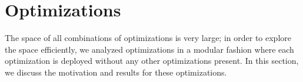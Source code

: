 \section{Optimizations}\label{sec:opt}
The space of all combinations of optimizations is very large; in order to
explore the space efficiently, we analyzed optimizations in a modular fashion
where each optimization is deployed without any other optimizations present. In
this section, we discuss the motivation and results for these optimizations.
